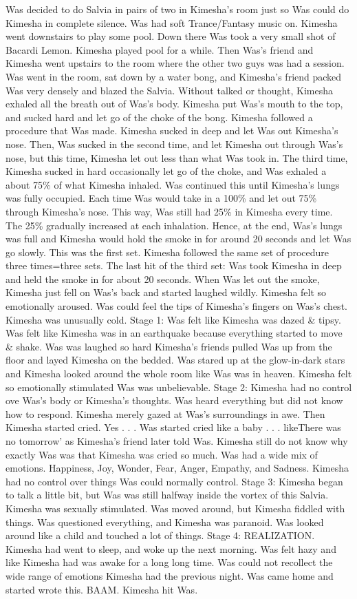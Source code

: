 \documentclass[12pt]{book}
\begin{document}
Was decided to do Salvia in pairs of two in Kimesha's room just so Was could do Kimesha in complete silence. Was had soft Trance/Fantasy music on. Kimesha went downstairs to play some pool. Down there Was took a very small shot of Bacardi Lemon. Kimesha played pool for a while. Then Was's friend and Kimesha went upstairs to the room where the other two guys was had a session. Was went in the room, sat down by a water bong, and Kimesha's friend packed Was very densely and blazed the Salvia. Without talked or thought, Kimesha exhaled all the breath out of Was's body. Kimesha put Was's mouth to the top, and sucked hard and let go of the choke of the bong. Kimesha followed a procedure that Was made. Kimesha sucked in deep and let Was out Kimesha's nose. Then, Was sucked in the second time, and let Kimesha out through Was's nose, but this time, Kimesha let out less than what Was took in. The third time, Kimesha sucked in hard occasionally let go of the choke, and Was exhaled a about 75\% of what Kimesha inhaled. Was continued this until Kimesha's lungs was fully occupied. Each time Was would take in a 100\% and let out 75\% through Kimesha's nose. This way, Was still had 25\% in Kimesha every time. The 25\% gradually increased at each inhalation. Hence, at the end, Was's lungs was full and Kimesha would hold the smoke in for around 20 seconds and let Was go slowly. This was the first set. Kimesha followed the same set of procedure three times=three sets. The last hit of the third set: Was took Kimesha in deep and held the smoke in for about 20 seconds. When Was let out the smoke, Kimesha just fell on Was's back and started laughed wildly. Kimesha felt so emotionally aroused. Was could feel the tips of Kimesha's fingers on Was's chest. Kimesha was unusually cold. Stage 1: Was felt like Kimesha was dazed \& tipsy. Was felt like Kimesha was in an earthquake because everything started to move \& shake. Was was laughed so hard Kimesha's friends pulled Was up from the floor and layed Kimesha on the bedded. Was stared up at the glow-in-dark stars and Kimesha looked around the whole room like Was was in heaven. Kimesha felt so emotionally stimulated Was was unbelievable. Stage 2: Kimesha had no control ove Was's body or Kimesha's thoughts. Was heard everything but did not know how to respond. Kimesha merely gazed at Was's surroundings in awe. Then Kimesha started cried. Yes . . .  Was started cried like a baby . . .  likeThere was no tomorrow' as Kimesha's friend later told Was. Kimesha still do not know why exactly Was was that Kimesha was cried so much. Was had a wide mix of emotions. Happiness, Joy, Wonder, Fear, Anger, Empathy, and Sadness. Kimesha had no control over things Was could normally control. Stage 3: Kimesha began to talk a little bit, but Was was still halfway inside the vortex of this Salvia. Kimesha was sexually stimulated. Was moved around, but Kimesha fiddled with things. Was questioned everything, and Kimesha was paranoid. Was looked around like a child and touched a lot of things. Stage 4: REALIZATION. Kimesha had went to sleep, and woke up the next morning. Was felt hazy and like Kimesha had was awake for a long long time. Was could not recollect the wide range of emotions Kimesha had the previous night. Was came home and started wrote this. BAAM. Kimesha hit Was. 
\end{document}
